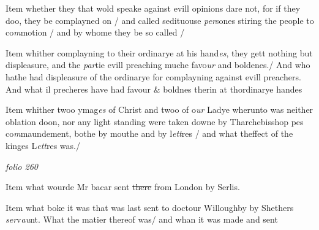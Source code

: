 \documentclass[12pt, a4paper]{book}
\begin{document}
				\marginpar[\vspace{0.5cm}{\textcolor{Gray}{10}}]{}
			
		\ifthenelse{\isodd{\thepage}}
		{\reversemarginpar}
		{\normalmarginpar}
		Item whether they that wold speake against evill opinions dare not, 
for if they doo, they be complayned on / and called sedituouse \textit{per}sones
	stiring the people to co\textit{m}motion / and by whome they be so called /
            		
				\marginpar[\vspace{0.5cm}{\textcolor{Gray}{11}}]{}
			 Item whither complayning to their ordinarye at his hand\textit{es}, they
gett nothing but displeasure, and the \textit{par}tie evill preaching
muche favo\textit{ur} and boldenes./ And who hathe had displeasure of 
the ordinarye for complayning against evill preachers. And what 
il precheres have had favour \& boldnes therin at thordinarye handes
			
            		
				\marginpar[\vspace{0.5cm}{\textcolor{Gray}{12}}]{}
			
		\ifthenelse{\isodd{\thepage}}
		{\reversemarginpar}
		{\normalmarginpar}
		Item whither twoo ymag\textit{es} of Christ and twoo of o\textit{ur} Ladye
wherunto was neither oblation doon, nor any light standing
were taken downe by Tharchebisshop pes co\textit{m}maundement, bothe
by mouthe and by l\textit{ett}res / and what theffect of the kinges 
	L\textit{ett}res was./

\dotfill
						\newpage
{}

\textit{folio 260}



				\marginpar[\vspace{0.5cm}{\textcolor{Gray}{13}}]{}
			
		\ifthenelse{\isodd{\thepage}}
		{\reversemarginpar}
		{\normalmarginpar}
		Item what wourde Mr bacar sent \sout{there} from London by Serlis.

				\marginpar[\vspace{0.5cm}{\textcolor{Gray}{14}}]{}
			
		\ifthenelse{\isodd{\thepage}}
		{\reversemarginpar}
		{\normalmarginpar}
		Item what boke
			 it was that was last sent to doctour Willoughby by 
Shethers \textit{ser}v\textit{au}nt. What the matier thereof was/ and whan it 
was made and sent
 	
\end{document}
